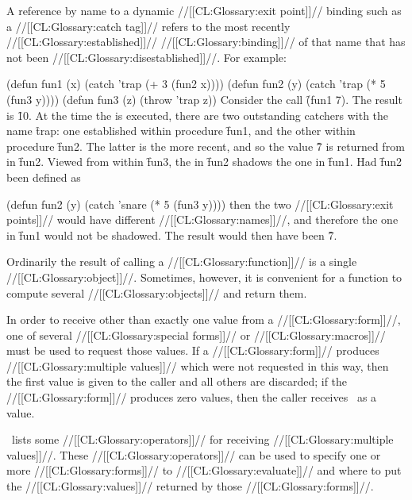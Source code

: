 A reference by name to a dynamic //[[CL:Glossary:exit point]]// binding such as
a //[[CL:Glossary:catch tag]]// refers to the most recently 
//[[CL:Glossary:established]]// //[[CL:Glossary:binding]]// of that name that has not been 
//[[CL:Glossary:disestablished]]//.  For example:

\code
 (defun fun1 (x)
   (catch 'trap (+ 3 (fun2 x))))
 (defun fun2 (y)
   (catch 'trap (* 5 (fun3 y))))
 (defun fun3 (z)
   (throw 'trap z))
\endcode
Consider the call \f{(fun1 7)}.  The result is \f{10}.  At the time
the  is executed, there are two outstanding catchers with the
name \f{trap}: one established within procedure \f{fun1}, and the other
within procedure \f{fun2}.  The latter is the more recent, and so the
value \f{7} is returned from  in \f{fun2}.
Viewed from within \f{fun3}, the  
in \f{fun2} shadows the one in \f{fun1}.
Had \f{fun2} been defined as

\code
 (defun fun2 (y)
   (catch 'snare (* 5 (fun3 y))))
\endcode
then the two //[[CL:Glossary:exit points]]// 
would have different //[[CL:Glossary:names]]//, and therefore the one
in \f{fun1} would not be shadowed.  The result would then have been \f{7}.

\endSubsection%


Ordinarily the result of calling a //[[CL:Glossary:function]]// is a single //[[CL:Glossary:object]]//.
Sometimes, however, it is convenient for a function to compute several
//[[CL:Glossary:objects]]// and return them.


In order to receive other than exactly one value from a //[[CL:Glossary:form]]//,
one of several //[[CL:Glossary:special forms]]// or //[[CL:Glossary:macros]]// must be used to request those
values.  If a //[[CL:Glossary:form]]// produces //[[CL:Glossary:multiple values]]// which were not
requested in this way, then the first value is given to the caller and
all others are discarded; if the //[[CL:Glossary:form]]// produces zero values,
then the caller receives \nil\ as a value.

\Thenextfigure\ lists 
some //[[CL:Glossary:operators]]// for receiving //[[CL:Glossary:multiple values]]//.
These //[[CL:Glossary:operators]]// can be used to specify 
    one or more //[[CL:Glossary:forms]]// to //[[CL:Glossary:evaluate]]// 
and where to put the //[[CL:Glossary:values]]// returned by those //[[CL:Glossary:forms]]//.


